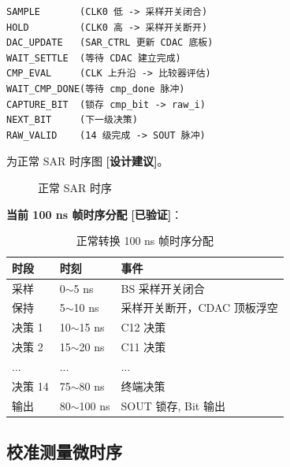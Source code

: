 \documentclass[UTF8,a4paper,11pt]{ctexart}
\newcommand{\verified}{\textcolor{verifiedgreen}{\textbf{[已验证]}}}
\newcommand{\suggested}{\textcolor{suggestblue}{\textbf{[设计建议]}}}
\begin{document}
\begin{lstlisting}[style=textstyle]
SAMPLE       (CLK0 低 -> 采样开关闭合)
HOLD         (CLK0 高 -> 采样开关断开)
DAC_UPDATE   (SAR_CTRL 更新 CDAC 底板)
WAIT_SETTLE  (等待 CDAC 建立完成)
CMP_EVAL     (CLK 上升沿 -> 比较器评估)
WAIT_CMP_DONE(等待 cmp_done 脉冲)
CAPTURE_BIT  (锁存 cmp_bit -> raw_i)
NEXT_BIT     (下一级决策)
RAW_VALID    (14 级完成 -> SOUT 脉冲)
\end{lstlisting}

 为正常 SAR 时序图 \suggested。

\begin{figure}[H]
\centering
{}
\caption{正常 SAR 时序}
\label{fig:normal-timing}
\end{figure}

\textbf{当前 100 ns 帧时序分配} \verified：

\begin{table}[H]
\centering
\caption{正常转换 100 ns 帧时序分配}
\label{tab:normal-timing}
\begin{tabular}{lll}
\toprule
时段 & 时刻 & 事件 \\
\midrule
采样     & 0$\sim$5 ns     & BS 采样开关闭合 \\
保持     & 5$\sim$10 ns    & 采样开关断开，CDAC 顶板浮空 \\
决策 1   & 10$\sim$15 ns   & C12 决策 \\
决策 2   & 15$\sim$20 ns   & C11 决策 \\
...      & ...             & ... \\
决策 14  & 75$\sim$80 ns   & 终端决策 \\
输出     & 80$\sim$100 ns  & SOUT 锁存, Bit 输出 \\
\bottomrule
\end{tabular}
\end{table}

\subsection{校准测量微时序}
\end{document}
